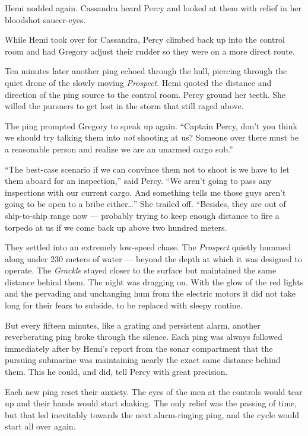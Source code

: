 \documentclass[
]{scrbook}
\begin{document}
Hemi nodded again. Cassandra heard Percy and looked at them with relief
in her bloodshot saucer-eyes.

While Hemi took over for Cassandra, Percy climbed back up into the
control room and had Gregory adjust their rudder so they were on a more
direct route.

Ten minutes later another ping echoed through the hull, piercing through
the quiet drone of the slowly moving \emph{Prospect}. Hemi quoted the
distance and direction of the ping source to the control room. Percy
ground her teeth. She willed the pursuers to get lost in the storm that
still raged above.

The ping prompted Gregory to speak up again. ``Captain Percy, don't you
think we should try talking them into \emph{not} shooting at us? Someone
over there must be a reasonable person and realize we are an unarmed
cargo sub.''

``The best-case scenario if we can convince them not to shoot is we have
to let them aboard for an inspection,'' said Percy. ``We aren't going to
pass any inspections with our current cargo. And something tells me
those guys aren't going to be open to a bribe either\ldots{}'' She
trailed off. ``Besides, they are out of ship-to-ship range now ---
probably trying to keep enough distance to fire a torpedo at us if we
come back up above two hundred meters.

They settled into an extremely low-speed chase. The \emph{Prospect}
quietly hummed along under 230 meters of water --- beyond the depth at
which it was designed to operate. The \emph{Grackle} stayed closer to
the surface but maintained the same distance behind them. The night was
dragging on. With the glow of the red lights and the pervading and
unchanging hum from the electric motors it did not take long for their
fears to subside, to be replaced with sleepy routine.

But every fifteen minutes, like a grating and persistent alarm, another
reverberating ping broke through the silence. Each ping was always
followed immediately after by Hemi's report from the sonar compartment
that the pursuing submarine was maintaining nearly the exact same
distance behind them. This he could, and did, tell Percy with great
precision.

Each new ping reset their anxiety. The eyes of the men at the controls
would tear up and their hands would start shaking. The only relief was
the passing of time, but that led inevitably towards the next
alarm-ringing ping, and the cycle would start all over again.
\end{document}
